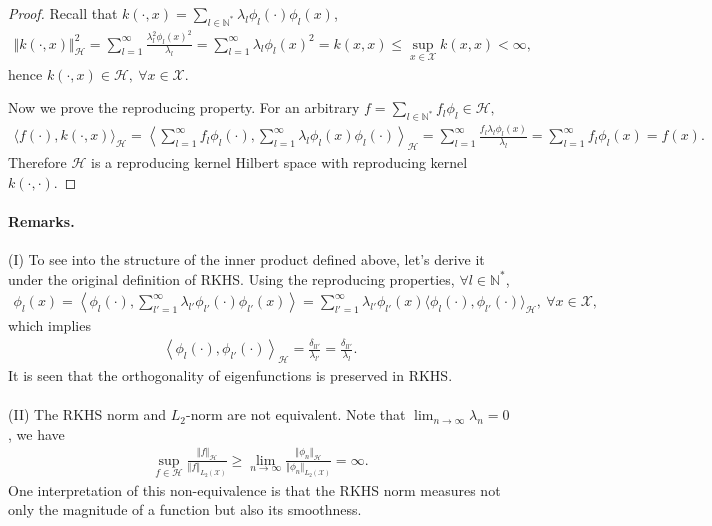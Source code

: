 \documentclass{article}
\begin{document}
\begin{proof}
Recall that $k(\cdot, x) = \sum_{l\in\mathbb{N}^*} \lambda_l\phi_l(\cdot)\phi_l(x)$,
\begin{align*}
	\Vert k(\cdot, x)\Vert_\mathcal{H}^2 = \sum_{l=1}^\infty \frac{\lambda_l^2\phi_l(x)^2}{\lambda_l} = \sum_{l=1}^\infty \lambda_l\phi_l(x)^2 = k(x,x) \leq \sup_{x\in\mathcal{X}} k(x,x) < \infty,\tag{5.30}
\end{align*}	
hence $k(\cdot, x) \in \mathcal{H},\ \forall x\in\mathcal{X}.$\vspace{0.1cm}
	
Now we prove the reproducing property. For an arbitrary $f = \sum_{l\in\mathbb{N}^*}f_l\phi_l \in\mathcal{H},$
\begin{align*}
	\langle f(\cdot),k(\cdot,x)\rangle_\mathcal{H} = \left\langle\sum_{l=1}^\infty f_l\phi_l(\cdot), \sum_{l=1}^\infty \lambda_l\phi_l(x)\phi_l(\cdot)\right\rangle_\mathcal{H} = \sum_{l=1}^\infty\frac{f_l\lambda_l\phi_l(x)}{\lambda_l} = \sum_{l=1}^\infty f_l\phi_l(x) = f(x).\tag{5.31}
\end{align*}
Therefore $\mathcal{H}$ is a reproducing kernel Hilbert space with reproducing kernel $k(\cdot,\cdot)$.
\end{proof} 

\paragraph{Remarks.} (I) To see into the structure of the inner product defined above, let's derive it under the original definition of RKHS.
Using the reproducing properties, $\forall l\in\mathbb{N}^*$,
\begin{align*}
	\phi_l(x) = \left\langle \phi_l(\cdot), \sum_{l'=1}^\infty\lambda_{l'}\phi_{l'}(\cdot)\phi_{l'}(x)\right\rangle = \sum_{l'=1}^\infty\lambda_{l'}\phi_{l'}(x)\langle \phi_l(\cdot),\phi_{l'}(\cdot)\rangle_\mathcal{H},\ \forall x\in\mathcal{X},\tag{5.32}
\end{align*}
which implies
\begin{align*}
	\left\langle \phi_l(\cdot),\phi_{l'}(\cdot)\right\rangle_\mathcal{H} = \frac{\delta_{ll'}}{\lambda_{l'}} = \frac{\delta_{ll'}}{\lambda_{l}}.\tag{5.33}
\end{align*}
It is seen that the orthogonality of eigenfunctions is preserved in RKHS.

\paragraph{} (II) The RKHS norm and $L_2$-norm are not equivalent. Note that $\lim_{n\to\infty} \lambda_n = 0$, we have
\begin{align*}
	\sup_{f\in\mathcal{H}} \frac{\Vert f\Vert_\mathcal{H}}{\Vert f\Vert_{L_2(\mathcal{X})}} \geq \lim_{n\to\infty} \frac{\Vert \phi_n\Vert_\mathcal{H}}{\Vert \phi_n\Vert_{L_2(\mathcal{X})}} = \infty.\tag{5.34}
\end{align*}
One interpretation of this non-equivalence is that the RKHS norm measures not only the magnitude of a function but also its smoothness.
\end{document}
